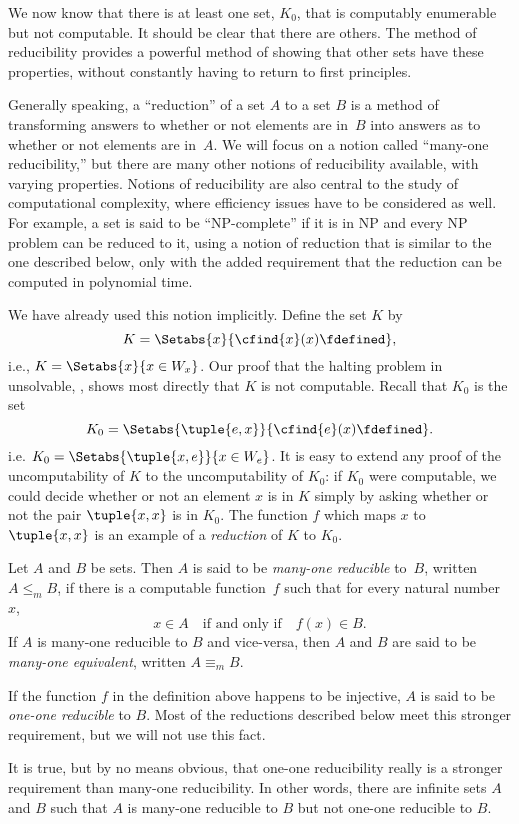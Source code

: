 \documentclass[../../../include/open-logic-section]{subfiles}
\begin{document}

\begin{explain}
We now know that there is at least one set, $K_0$, that is computably
enumerable but not computable. It should be clear that there are
others. The method of reducibility provides a powerful method of
showing that other sets have these properties, without constantly
having to return to first principles.

Generally speaking, a ``reduction'' of a set $A$ to a set $B$ is a
method of transforming answers to whether or not elements are in~$B$
into answers as to whether or not elements are in~$A$. We will focus
on a notion called ``many-one reducibility,'' but there are many other
notions of reducibility available, with varying properties. Notions of
reducibility are also central to the study of computational
complexity, where efficiency issues have to be considered as well. For
example, a set is said to be ``NP-complete'' if it is in NP and every
NP problem can be reduced to it, using a notion of reduction that is
similar to the one described below, only with the added requirement
that the reduction can be computed in polynomial time.

We have already used this notion implicitly. Define the set $K$ by
\[
K = \Setabs{x}{\cfind{x}(x) \fdefined},
\]
i.e., $K = \Setabs{x}{x \in W_x}$. Our proof that the halting problem
in unsolvable, , shows most directly
that $K$ is not computable. Recall that $K_0$ is the set
\[
K_0 = \Setabs{\tuple{e, x}}{\cfind{e}(x) \fdefined }.
\]
i.e. $K_0 = \Setabs{\tuple{x,e}}{x \in W_e}$. It is easy to extend any
proof of the uncomputability of $K$ to the uncomputability of $K_0$:
if $K_0$ were computable, we could decide whether or not an element
$x$ is in $K$ simply by asking whether or not the pair $\tuple{x, x}$
is in $K_0$. The function $f$ which maps $x$ to $\tuple{x, x}$ is an
example of a \emph{reduction} of $K$ to $K_0$.
\end{explain}

\begin{defn}
Let $A$ and $B$ be sets. Then $A$ is said to be \emph{many-one
  reducible} to~$B$, written $A \leq_m B$, if there is a computable
function~$f$ such that for every natural number~$x$,
\[
x \in A \quad \text{if and only if} \quad f(x) \in B.
\]
If $A$ is many-one reducible to $B$ and vice-versa, then $A$ and $B$
are said to be \emph{many-one equivalent}, written $A \equiv_m B$.
\end{defn}

If the function $f$ in the definition above happens to be injective,
$A$ is said to be \emph{one-one reducible} to $B$. Most of the
reductions described below meet this stronger requirement, but we will
not use this fact.

\begin{digress}
It is true, but by no means obvious, that one-one reducibility really
is a stronger requirement than many-one reducibility. In other words,
there are infinite sets $A$ and $B$ such that $A$ is many-one
reducible to $B$ but not one-one reducible to $B$.
\end{digress}
\end{document}
